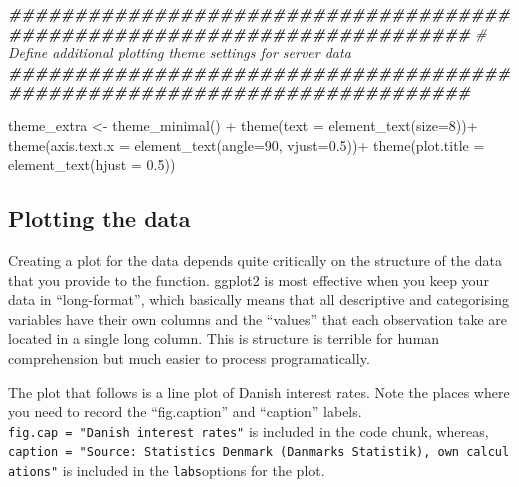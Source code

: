 \documentclass[
]{book}
\newenvironment{Shaded}{\begin{snugshade}}{\end{snugshade}}
\newcommand{\AttributeTok}[1]{\textcolor[rgb]{0.77,0.63,0.00}{#1}}
\newcommand{\CommentTok}[1]{\textcolor[rgb]{0.56,0.35,0.01}{\textit{#1}}}
\newcommand{\DecValTok}[1]{\textcolor[rgb]{0.00,0.00,0.81}{#1}}
\newcommand{\DocumentationTok}[1]{\textcolor[rgb]{0.56,0.35,0.01}{\textbf{\textit{#1}}}}
\newcommand{\FloatTok}[1]{\textcolor[rgb]{0.00,0.00,0.81}{#1}}
\newcommand{\FunctionTok}[1]{\textcolor[rgb]{0.00,0.00,0.00}{#1}}
\newcommand{\NormalTok}[1]{#1}
\newcommand{\OtherTok}[1]{\textcolor[rgb]{0.56,0.35,0.01}{#1}}
\newcommand{\SpecialCharTok}[1]{\textcolor[rgb]{0.00,0.00,0.00}{#1}}
\begin{document}
\begin{Shaded}
\begin{Highlighting}[]
\DocumentationTok{\#\#\#\#\#\#\#\#\#\#\#\#\#\#\#\#\#\#\#\#\#\#\#\#\#\#\#\#\#\#\#\#\#\#\#\#\#\#\#\#\#\#\#\#\#\#\#\#\#\#\#\#\#\#\#\#\#\#\#\#\#\#\#\#\#\#\#\#\#\#\#\#\#}
\CommentTok{\# Define additional plotting theme settings for server data}
\DocumentationTok{\#\#\#\#\#\#\#\#\#\#\#\#\#\#\#\#\#\#\#\#\#\#\#\#\#\#\#\#\#\#\#\#\#\#\#\#\#\#\#\#\#\#\#\#\#\#\#\#\#\#\#\#\#\#\#\#\#\#\#\#\#\#\#\#\#\#\#\#\#\#\#\#\#}

\NormalTok{theme\_extra }\OtherTok{\textless{}{-}} \FunctionTok{theme\_minimal}\NormalTok{() }\SpecialCharTok{+}
    \FunctionTok{theme}\NormalTok{(}\AttributeTok{text =} \FunctionTok{element\_text}\NormalTok{(}\AttributeTok{size=}\DecValTok{8}\NormalTok{))}\SpecialCharTok{+}
    \FunctionTok{theme}\NormalTok{(}\AttributeTok{axis.text.x =} \FunctionTok{element\_text}\NormalTok{(}\AttributeTok{angle=}\DecValTok{90}\NormalTok{, }\AttributeTok{vjust=}\FloatTok{0.5}\NormalTok{))}\SpecialCharTok{+}
    \FunctionTok{theme}\NormalTok{(}\AttributeTok{plot.title =} \FunctionTok{element\_text}\NormalTok{(}\AttributeTok{hjust =} \FloatTok{0.5}\NormalTok{))}
\end{Highlighting}
\end{Shaded}

\hypertarget{plotting-the-data}{%
\subsection{Plotting the data}\label{plotting-the-data}}

Creating a plot for the data depends quite critically on the structure of the data that you provide to the function. ggplot2 is most effective when you keep your data in ``long-format'', which basically means that all descriptive and categorising variables have their own columns and the ``values'' that each observation take are located in a single long column. This is structure is terrible for human comprehension but much easier to process programatically.

The plot that follows is a line plot of Danish interest rates. Note the places where you need to record the ``fig.caption'' and ``caption'' labels. \texttt{fig.cap\ =\ "Danish\ interest\ rates"} is included in the code chunk, whereas,
\texttt{caption\ =\ "Source:\ Statistics\ Denmark\ (Danmarks\ Statistik),\ own\ calculations"} is included in the \texttt{labs}options for the plot.
\end{document}
